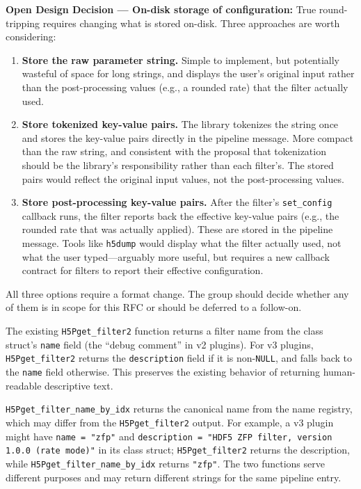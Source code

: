 \documentclass[../HDF5_RFC.tex]{subfiles}
\begin{document}
\noindent\colorbox{yellow!25}{\parbox{\dimexpr\linewidth-2\fboxsep}{%
  \textbf{Open Design Decision --- On-disk storage of configuration:}
  True round-tripping requires changing what is stored on-disk. Three
  approaches are worth considering:
  \begin{enumerate}
    \item \textbf{Store the raw parameter string.} Simple to implement, but
          potentially wasteful of space for long strings, and displays the
          user's original input rather than the post-processing values
          (e.g., a rounded rate) that the filter actually used.
    \item \textbf{Store tokenized key-value pairs.} The library tokenizes the
          string once and stores the key-value pairs directly in the pipeline
          message. More compact than the raw string, and consistent with the
          proposal that tokenization should be the library's responsibility
          rather than each filter's. The stored pairs would reflect the
          original input values, not the post-processing values.
    \item \textbf{Store post-processing key-value pairs.} After the filter's
          \texttt{set\_config} callback runs, the filter reports back the
          effective key-value pairs (e.g., the rounded rate that was actually
          applied). These are stored in the pipeline message. Tools like
          \texttt{h5dump} would display what the filter actually used, not what
          the user typed---arguably more useful, but requires a new callback
          contract for filters to report their effective configuration.
  \end{enumerate}
  All three options require a format change. The group should decide whether
  any of them is in scope for this RFC or should be deferred to a follow-on.
}}

The existing \texttt{H5Pget\_filter2} function returns a
filter name from the class struct's \texttt{name} field (the ``debug comment'' in v2
plugins). For v3 plugins, \texttt{H5Pget\_filter2} returns the \texttt{description}
field if it is non-\texttt{NULL}, and falls back to the \texttt{name} field otherwise.
This preserves the existing behavior of returning human-readable descriptive
text.

\texttt{H5Pget\_filter\_name\_by\_idx} returns the canonical name from the name
registry, which may differ from the \texttt{H5Pget\_filter2} output. For example, a
v3 plugin might have \texttt{name = "zfp"} and
\texttt{description = "HDF5 ZFP filter, version 1.0.0 (rate mode)"} in its class
struct; \texttt{H5Pget\_filter2} returns the description, while
\texttt{H5Pget\_filter\_name\_by\_idx} returns \texttt{"zfp"}. The two functions serve
different purposes and may return different strings for the same pipeline entry.
\end{document}
